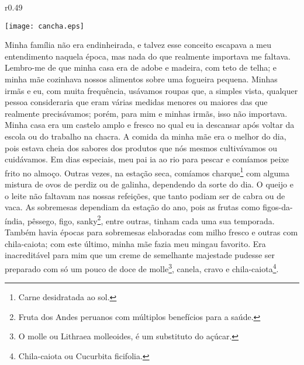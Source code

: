 \ifdefined\EnableIncludeImages
\begin{wrapfigure}{r}{0.49\textwidth}
  \begin{center}
  \vspace{-20pt}
    \texttt{[image: cancha.eps]}
  \end{center}
  \vspace{-20pt}
\end{wrapfigure}
\fi
Minha família não era endinheirada, e talvez esse conceito escapava a meu entendimento naquela época, mas nada do que realmente importava me faltava.
Lembro-me de que minha casa era de adobe e madeira, com teto de telha; e minha mãe cozinhava nossos alimentos sobre uma fogueira pequena. Minhas irmãs e eu, com muita frequência, usávamos roupas que, a simples vista, qualquer pessoa consideraria que eram várias medidas menores ou maiores das que realmente precisávamos;
porém, para mim e minhas irmãs, isso não importava. Minha casa era um castelo amplo e fresco no qual eu ia descansar após voltar da escola ou do trabalho na chacra. 
A comida da minha mãe era o melhor do dia, pois estava cheia dos sabores dos produtos que nós mesmos cultivávamos ou cuidávamos. 
Em dias especiais, meu pai ia ao rio para pescar e comíamos peixe frito no almoço. Outras vezes, na estação seca, comíamos charque\footnote{Carne desidratada ao sol.} com alguma mistura de ovos de perdiz ou de galinha, dependendo da sorte do dia.
O queijo e o leite não faltavam nas nossas refeições, que tanto podiam ser de cabra ou de vaca.
As sobremesas dependiam da estação do ano, pois as frutas como figos-da-índia, pêssego, figo, sanky\footnote{Fruta dos Andes peruanos com múltiplos benefícios para a saúde.}, entre outras, tinham cada uma sua temporada. Também havia épocas para sobremesas elaboradas com milho fresco e outras com chila-caiota; com este último, minha mãe fazia meu mingau favorito. Era inacreditável para mim que um creme de semelhante majestade pudesse ser preparado com só um pouco de doce de molle\footnote{O molle ou Lithraea molleoides, é um substituto do açúcar.}, canela, cravo e chila-caiota\footnote{Chila-caiota ou Cucurbita ficifolia.}.

